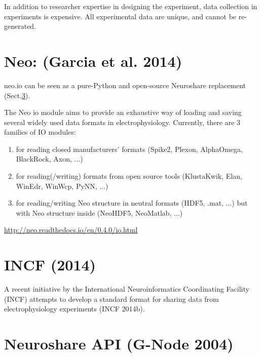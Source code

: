 In addition to researcher expertise in designing the experiment, data collection
in experiments is expensive. All experimental data are unique, and cannot be
re-generated.

\section{Neo: (Garcia et al. 2014)}
\label{sec:Neo-library}

neo.io can be seen as a pure-Python and open-source Neuroshare replacement
(Sect.\ref{sec:Neuroshare-API}).

The Neo io module aims to provide an exhaustive way of loading and saving
several widely used data formats in electrophysiology.
Currently, there are 3 families of IO modules:
\begin{enumerate}
  \item for reading closed manufacturers' formats (Spike2, Plexon, AlphaOmega, BlackRock, Axon, ...)

  \item for reading(/writing) formats from open source tools (KlustaKwik, Elan,
 WinEdr, WinWcp, PyNN, ...)

   \item for reading/writing Neo structure in neutral formats (HDF5, .mat, ...)
   but with Neo structure inside (NeoHDF5, NeoMatlab, ...)
\end{enumerate}
\url{http://neo.readthedocs.io/en/0.4.0/io.html}


\section{INCF (2014)}
\label{sec:INCF-2014-format}

A recent initiative by the International Neuroinformatics Coordinating Facility
(INCF) attempts to develop a standard format for sharing data from
electrophysiology experiments (INCF 2014b).



\section{Neuroshare API (G-Node 2004)}
\label{sec:Neuroshare-API}

